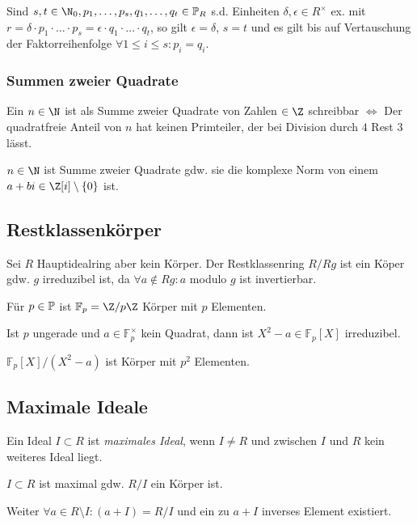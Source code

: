 Sind $s, t \in \N_0, p_1,\dots,p_s,q_1,\dots,q_t \in \Primes_R$ s.d. Einheiten $\delta, \epsilon \in R^\times$ ex. mit $r = \delta \cdot p_1 \cdot \dots \cdot p_s = \epsilon \cdot q_1 \cdot \dots \cdot q_t$, so gilt $\epsilon = \delta$, $s = t$ und es gilt bis auf Vertauschung der Faktorreihenfolge $\forall 1 \leq i \leq s : p_i = q_i$.

\subsubsection*{Summen zweier Quadrate}

Ein $n \in \N$ ist als Summe zweier Quadrate von Zahlen $\in \Z$ schreibbar $\iff$ Der quadratfreie Anteil von $n$ hat keinen Primteiler, der bei Division durch $4$ Rest $3$ lässt.

\spacing

$n \in \N$ ist Summe zweier Quadrate gdw. sie die komplexe Norm von einem $a + bi \in \Z[i] \setminus \{0\}$ ist.

\subsection*{Restklassenkörper}

Sei $R$ Hauptidealring aber kein Körper. Der Restklassenring $R/Rg$ ist ein Köper gdw. $g$ irreduzibel ist, da $\forall a \notin Rg : a$ modulo $g$ ist invertierbar.

\vspace*{1mm}

Für $p \in \mathbb{P}$ ist $\mathbb{F}_p = \Z/p\Z$ Körper mit $p$ Elementen.

\vspace*{1mm}

Ist $p$ ungerade und $a \in \mathbb{F}_p^\times$ kein Quadrat, dann ist $X^2 - a \in \mathbb{F}_p[X]$ irreduzibel.

$\mathbb{F}_p[X]/(X^2-a)$ ist Körper mit $p^2$ Elementen.

\subsection*{Maximale Ideale}

Ein Ideal $I \subset R$ ist \emph{maximales Ideal}, wenn $I \neq R$ und zwischen $I$ und $R$ kein weiteres Ideal liegt.

$I \subset R$ ist maximal gdw. $R/I$ ein Körper ist.

Weiter $\forall a \in R \setminus I : (a + I) = R/I$ und ein zu $a + I$ inverses Element existiert.


